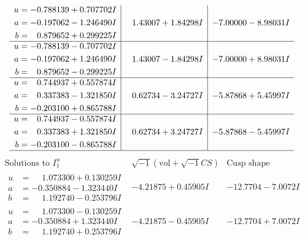 \documentclass[1p]{elsarticle_modified}
\theoremstyle{definition}
\newcommand{\I}{\sqrt{-1}}
\begin{document}
$$\begin{array}{c|c|c}
\begin{aligned}
u &= -0.788139 + 0.707702 I \\
a &= -0.197062 - 1.246490 I \\
b &= \phantom{-}0.879652 + 0.299225 I\end{aligned}
 & \phantom{-}1.43007 + 1.84298 I & -7.00000 - 8.98031 I \\ \hline\begin{aligned}
u &= -0.788139 - 0.707702 I \\
a &= -0.197062 + 1.246490 I \\
b &= \phantom{-}0.879652 - 0.299225 I\end{aligned}
 & \phantom{-}1.43007 - 1.84298 I & -7.00000 + 8.98031 I \\ \hline\begin{aligned}
u &= \phantom{-}0.744937 + 0.557874 I \\
a &= \phantom{-}0.337383 - 1.321850 I \\
b &= -0.203100 + 0.865788 I\end{aligned}
 & \phantom{-}0.62734 - 3.24727 I & -5.87868 + 5.45997 I \\ \hline\begin{aligned}
u &= \phantom{-}0.744937 - 0.557874 I \\
a &= \phantom{-}0.337383 + 1.321850 I \\
b &= -0.203100 - 0.865788 I\end{aligned}
 & \phantom{-}0.62734 + 3.24727 I & -5.87868 - 5.45997 I\\
 \hline 
 \end{array}$$\newpage$$\begin{array}{c|c|c}  
\text{Solutions to }I^u_{1}& \I (\text{vol} + \sqrt{-1}CS) & \text{Cusp shape}\\
 \hline 
\begin{aligned}
u &= \phantom{-}1.073300 + 0.130259 I \\
a &= -0.350884 - 1.323440 I \\
b &= \phantom{-}1.192740 - 0.253796 I\end{aligned}
 & -4.21875 + 0.45905 I & -12.7704 - 7.0072 I \\ \hline\begin{aligned}
u &= \phantom{-}1.073300 - 0.130259 I \\
a &= -0.350884 + 1.323440 I \\
b &= \phantom{-}1.192740 + 0.253796 I\end{aligned}
 & -4.21875 - 0.45905 I & -12.7704 + 7.0072 I \\ \hline\begin{aligned}

\end{aligned}
\end{array}$$
\end{document}
